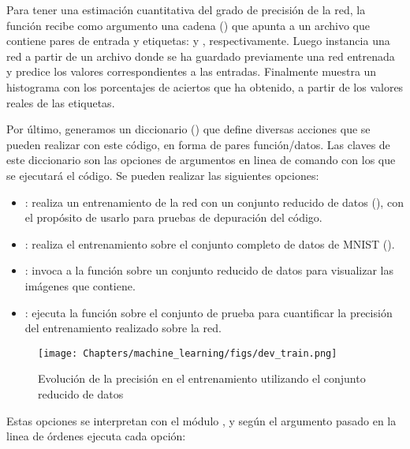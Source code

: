 
Para tener una estimación cuantitativa del grado de precisión de la red, la función  recibe como argumento una cadena () que apunta a un archivo que contiene pares de entrada y etiquetas:  y , respectivamente. Luego instancia una red a partir de un archivo donde se ha guardado previamente una red entrenada y predice los valores correspondientes a las entradas. Finalmente muestra un histograma con los porcentajes de aciertos que ha obtenido, a partir de los valores reales de las etiquetas. 


Por último, generamos un diccionario () que define diversas acciones que se pueden realizar con este código, en forma de pares función/datos. Las claves de este diccionario son las opciones de argumentos en linea de comando con los que se ejecutará el código. Se pueden realizar las siguientes opciones:
\begin{itemize}
    \item {}: realiza un entrenamiento de la red con un conjunto reducido de datos (), con el propósito de usarlo para pruebas de depuración del código.
    \item {}: realiza el entrenamiento sobre el conjunto completo de datos de MNIST ().
    \item {}: invoca a la función  sobre un conjunto reducido de datos para visualizar las imágenes que contiene.
    \item {}: ejecuta la función  sobre el conjunto de prueba  para cuantificar la precisión del entrenamiento realizado sobre la red.
\end{itemize}

\begin{figure}
    \begin{center}
        \texttt{[image: Chapters/machine\_learning/figs/dev\_train.png]}
    \end{center}
    \caption{Evolución de la precisión en el entrenamiento utilizando el conjunto reducido de datos}
    \label{fig:devtrain}
\end{figure}

Estas opciones se interpretan con el módulo , y según el argumento pasado en la linea de órdenes ejecuta cada opción:

